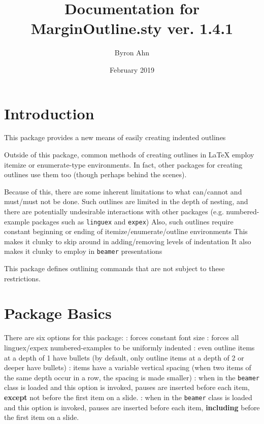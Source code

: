 \documentclass[11pt]{article}
\begin{document}
           
\title{Documentation for MarginOutline.sty ver. 1.4.1}
\author{Byron Ahn\footnotemark}
\date{February 2019}
\maketitle
{} 

\section{Introduction}
\1 This package provides a new means of easily creating indented outlines

\1 Outside of this package, common methods of creating outlines in LaTeX employ itemize or enumerate-type environments.
	\2 In fact, other packages for creating outlines use them too (though perhaps behind the scenes).

\1 Because of this, there are some inherent limitations to what can/cannot and must/must not be done.
	\2 Such outlines are limited in the depth of nesting, and there are potentially undesirable interactions with other packages (e.g. numbered-example packages such as \verb+linguex+ and \verb+expex+)
	\2 Also, such outlines require constant beginning or ending of itemize/enumerate/outline environments
		\3 This makes it clunky to skip around in adding/removing levels of indentation
		\3 It also makes it clunky to employ in \texttt{beamer} presentations

\1 This package defines outlining commands that are not subject to these restrictions.


\section{Package Basics}
\1 There are six options for this package:
	:	forces constant font size
	:	forces all linguex/expex numbered-examples to be uniformly indented
	:	even outline items at a depth of 1 have bullets (by default, only outline items at a depth of 2 or deeper have bullets)
	:	items have a variable vertical spacing (when two items of the same depth occur in a row, the spacing is made smaller)
	:	when in the \texttt{beamer} class is loaded and this option is invoked, pauses are inserted before each item, \textbf{except} not before the first item on a slide.
	:	when in the \texttt{beamer} class is loaded and this option is invoked, pauses are inserted before each item, \textbf{including} before the first item on a slide.
\end{document}

